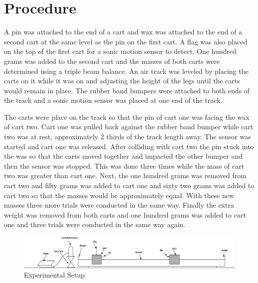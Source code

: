 \documentclass[12pt]{article}
\begin{document}
    \section{Procedure}
        A pin was attached to the end of a cart and wax was attached to the end of a second cart at the same level as the pin on the first cart. A flag was also placed on the top of the first cart for a sonic motion sensor to detect. One hundred grams was added to the second cart and the masses of both carts were determined using a triple beam balance. An air track was leveled by placing the carts on it while it was on and adjusting the height of the legs until the carts would remain in place. The rubber band bumpers were attached to both ends of the track and a sonic motion sensor was placed at one end of the track. 
        
        The carts were place on the track so that the pin of cart one was facing the wax of cart two. Cart one was pulled back against the rubber band bumper while cart two was at rest, approximately 2 thirds of the track length away. The sensor was started and cart one was released. After colliding with cart two the pin stuck into the was so that the carts moved together and impacted the other bumper and then the sensor was stopped. This was done three times while the mass of cart two was greater than cart one. Next, the one hundred grams was removed from cart two and fifty grams was added to cart one and sixty two grams was added to cart two so that the masses would be approximately equal. With these new masses three more trials were conducted in the same way. Finally the extra weight was removed from both carts and one hundred grams was added to cart one and three trials were conducted in the same way again.  
        \begin{figure}[H]
            \centering
            \includegraphics[width=\linewidth]{Setup.png}
            \caption{Experimental Setup}
        \end{figure}
\end{document}
